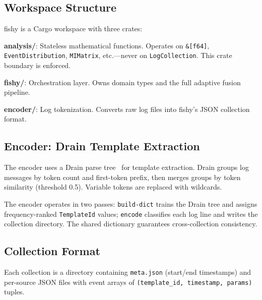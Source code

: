 \documentclass[10pt,twocolumn]{article}
\begin{document}
\subsection{Workspace Structure}

fishy is a Cargo workspace with three crates:

\textbf{analysis/}: Stateless mathematical functions. Operates on \texttt{\&[f64]}, \texttt{EventDistribution}, \texttt{MIMatrix}, etc.---never on \texttt{LogCollection}. This crate boundary is enforced.

\textbf{fishy/}: Orchestration layer. Owns domain types and the full adaptive fusion pipeline.

\textbf{encoder/}: Log tokenization. Converts raw log files into fishy's JSON collection format.

\subsection{Encoder: Drain Template Extraction}

The encoder uses a Drain parse tree~\cite{drain} for template extraction. Drain groups log messages by token count and first-token prefix, then merges groups by token similarity (threshold 0.5). Variable tokens are replaced with wildcards.

The encoder operates in two passes: \texttt{build-dict} trains the Drain tree and assigns frequency-ranked \texttt{TemplateId} values; \texttt{encode} classifies each log line and writes the collection directory. The shared dictionary guarantees cross-collection consistency.

\subsection{Collection Format}

Each collection is a directory containing \texttt{meta.json} (start/end timestamps) and per-source JSON files with event arrays of \texttt{(template\_id, timestamp, params)} tuples.
\end{document}
